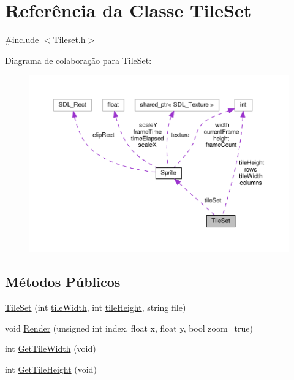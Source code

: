 \hypertarget{classTileSet}{\section{Referência da Classe Tile\+Set}
\label{classTileSet}
}


{\ttfamily \#include $<$Tileset.\+h$>$}



Diagrama de colaboração para Tile\+Set\+:
\nopagebreak
\begin{figure}[H]
\begin{center}
\leavevmode
\includegraphics[width=350pt]{classTileSet__coll__graph}
\end{center}
\end{figure}
\subsection*{Métodos Públicos}
\begin{DoxyCompactItemize}
\item 
\hyperlink{classTileSet_a671a1040ef1ba7600a6ea21faa950819}{Tile\+Set} (int \hyperlink{classTileSet_a9ba9087a6da877f78af6cdf9afb0af7c}{tile\+Width}, int \hyperlink{classTileSet_a9409211e1c5560f969b737714be977c0}{tile\+Height}, string file)
\item 
void \hyperlink{classTileSet_a110acfa6e07aa9e5af1798065f23b0f1}{Render} (unsigned int index, float x, float y, bool zoom=true)
\item 
int \hyperlink{classTileSet_a4114a74c06ab5241d904cce67538ae17}{Get\+Tile\+Width} (void)
\item 
int \hyperlink{classTileSet_a965e951eb3ccfd6e318b27c710d973a0}{Get\+Tile\+Height} (void)
\end{DoxyCompactItemize}
